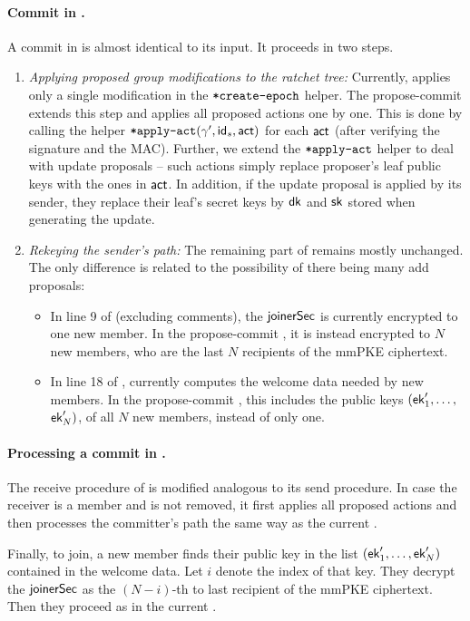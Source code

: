 \paragraph{Commit in \saik.}
A commit in \saik is almost identical to its  input. It proceeds in two steps.
\begin{enumerate}
	\item {\it Applying proposed group modifications to the ratchet tree:} Currently, \saik applies only a single modification in the ${\textnormal{\tt*create-epoch}}$ helper. The propose-commit \saik extends this step and applies all proposed actions one by one. This is done by calling the helper ${\textnormal{\tt*apply-act}}(\gamma', {\mathsf{id}}_s, \mathsf{act})$ for each $\mathsf{act}$ (after verifying the signature and the MAC). Further, we extend the ${\textnormal{\tt*apply-act}}$ helper to deal with update proposals -- such actions simply replace proposer's leaf public keys with the ones in $\mathsf{act}$. In addition, if the update proposal is applied by its sender, they replace their leaf's secret keys by ${\mathsf{dk}}$ and ${\mathsf{sk}}$ stored when generating the update.
	\item {\it Rekeying the sender's path:} The remaining part of  remains mostly unchanged. The only difference is related to the possibility of there being many add proposals:
	\begin{itemize}
		\item In line 9 of  (excluding comments), the ${\mathsf{joinerSec}}$ is currently encrypted to one new member. In the propose-commit \saik, it is instead encrypted to $N$ new members, who are the last $N$ recipients of the mmPKE ciphertext.
		\item In line 18 of , \saik currently computes the welcome data needed by new members. In the propose-commit \saik, this includes the public keys $({\mathsf{ek}}'_1, \dots,$ ${\mathsf{ek}}'_N)$, of all $N$ new members, instead of only one. 
	\end{itemize} 
\end{enumerate}

\paragraph{Processing a commit in \saik.}
The receive procedure of \saik is modified analogous to its send procedure. In case the receiver is a member and is not removed, it first applies all proposed actions and then processes the committer's path the same way as the current \saik.

Finally, to join, a new member finds their public key in the list $({\mathsf{ek}}'_1, \dots,{\mathsf{ek}}'_N)$ contained in the welcome data. Let $i$ denote the index of that key. They decrypt the ${\mathsf{joinerSec}}$ as the $(N-i)$-th to last recipient of the mmPKE ciphertext. Then they proceed as in the current \saik.

